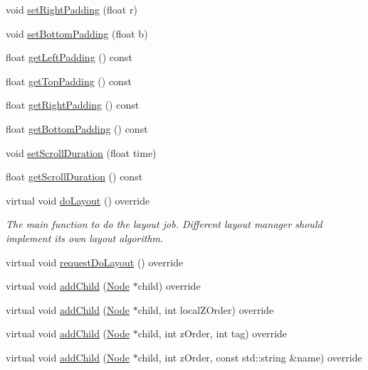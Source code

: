 \begin{DoxyCompactItemize}
\item 
void \hyperlink{classui_1_1ListView_a365a73786412617945110d39c685c6b2}{set\+Right\+Padding} (float r)
\item 
void \hyperlink{classui_1_1ListView_aa68f32002427564b3608cb5ee7a30c9b}{set\+Bottom\+Padding} (float b)
\item 
float \hyperlink{classui_1_1ListView_a6ea04d617c8705f8eb6e6fce706b737b}{get\+Left\+Padding} () const
\item 
float \hyperlink{classui_1_1ListView_afa41ccf9bd1b8301f33745756424625d}{get\+Top\+Padding} () const
\item 
float \hyperlink{classui_1_1ListView_ad2b4b1c9eceedda8d659058d2d6a92bf}{get\+Right\+Padding} () const
\item 
float \hyperlink{classui_1_1ListView_ae537c409ff29867ea5b747ddf048fd7c}{get\+Bottom\+Padding} () const
\item 
void \hyperlink{classui_1_1ListView_a9f0e93625317fa86700986bed97efc88}{set\+Scroll\+Duration} (float time)
\item 
float \hyperlink{classui_1_1ListView_a85116b79e39403d670411684410feef0}{get\+Scroll\+Duration} () const
\item 
\mbox{\label{classui_1_1ListView_a9aebab6351a573a175aacb11e4846b7d}} 
virtual void \hyperlink{classui_1_1ListView_a9aebab6351a573a175aacb11e4846b7d}{do\+Layout} () override
\begin{DoxyCompactList}\small\item\em The main function to do the layout job. Different layout manager should implement its own layout algorithm. \end{DoxyCompactList}\item 
virtual void \hyperlink{classui_1_1ListView_ab559aec6b481480fad169f2a53094028}{request\+Do\+Layout} () override
\item 
virtual void \hyperlink{classui_1_1ListView_a7fb7f42f3f3ee9e9ca8ee3bb959e2c32}{add\+Child} (\hyperlink{classNode}{Node} $\ast$child) override
\item 
virtual void \hyperlink{classui_1_1ListView_afb7109d348b36c0d672066589ef1e00b}{add\+Child} (\hyperlink{classNode}{Node} $\ast$child, int local\+Z\+Order) override
\item 
virtual void \hyperlink{classui_1_1ListView_aee4869d9b2ca6d88b5075f9078853644}{add\+Child} (\hyperlink{classNode}{Node} $\ast$child, int z\+Order, int tag) override
\item 
virtual void \hyperlink{classui_1_1ListView_a48d15dfd548d451a87af9a1300343725}{add\+Child} (\hyperlink{classNode}{Node} $\ast$child, int z\+Order, const std\+::string \&name) override

\end{DoxyCompactItemize}
